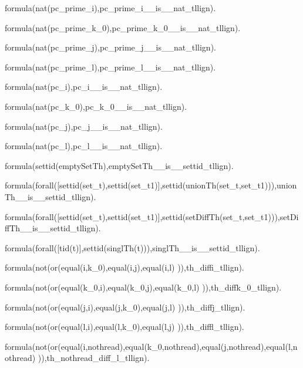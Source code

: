 formula(nat(pc\_prime\_i),pc\_prime\_i\_\_is\_\_nat\_tllign).

formula(nat(pc\_prime\_k\_0),pc\_prime\_k\_0\_\_is\_\_nat\_tllign).

formula(nat(pc\_prime\_j),pc\_prime\_j\_\_is\_\_nat\_tllign).

formula(nat(pc\_prime\_l),pc\_prime\_l\_\_is\_\_nat\_tllign).

formula(nat(pc\_i),pc\_i\_\_is\_\_nat\_tllign).

formula(nat(pc\_k\_0),pc\_k\_0\_\_is\_\_nat\_tllign).

formula(nat(pc\_j),pc\_j\_\_is\_\_nat\_tllign).

formula(nat(pc\_l),pc\_l\_\_is\_\_nat\_tllign).


formula(settid(emptySetTh),emptySetTh\_\_is\_\_settid\_tllign).

formula(forall([settid(set\_t),settid(set\_t1)],settid(unionTh(set\_t,set\_t1))),unionTh\_\_is\_\_settid\_tllign).

formula(forall([settid(set\_t),settid(set\_t1)],settid(setDiffTh(set\_t,set\_t1))),setDiffTh\_\_is\_\_settid\_tllign).

formula(forall([tid(t)],settid(singlTh(t))),singlTh\_\_is\_\_settid\_tllign).

formula(not(or(equal(i,k\_0),equal(i,j),equal(i,l) )),th\_diffi\_tllign).

formula(not(or(equal(k\_0,i),equal(k\_0,j),equal(k\_0,l) )),th\_diffk\_0\_tllign).

formula(not(or(equal(j,i),equal(j,k\_0),equal(j,l) )),th\_diffj\_tllign).

formula(not(or(equal(l,i),equal(l,k\_0),equal(l,j) )),th\_diffl\_tllign).

formula(not(or(equal(i,nothread),equal(k\_0,nothread),equal(j,nothread),equal(l,nothread) )),th\_nothread\_diff\_l\_tllign).




